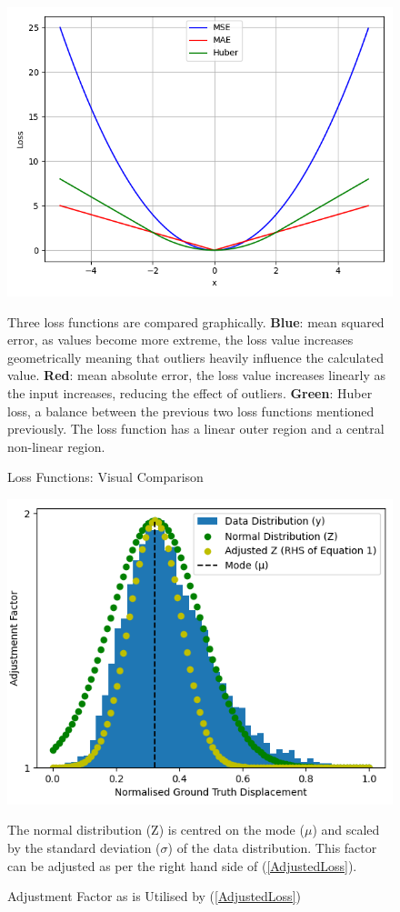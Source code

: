 \begin{figure}[h]
	\centering
	\includegraphics[scale=0.35]{Figures/lossPlots.png}
	\caption{Loss Functions: Visual Comparison} {Three loss functions are compared graphically. \textbf{Blue}: mean squared error, as values become more extreme, the loss value increases geometrically meaning that outliers heavily influence the calculated value. \textbf{Red}: mean absolute error, the loss value increases linearly as the input increases, reducing the effect of outliers. \textbf{Green}: Huber loss, a balance between the previous two loss functions mentioned previously. The loss function has a linear outer region and a central non-linear region.}
	\label{fig:lossPlots}
\end{figure}

\begin{figure}[h]
	\centering
	\includegraphics[scale=0.45]{Figures/norm_distr.png}
	\caption{Adjustment Factor as is Utilised by (\ref{AdjustedLoss})} {The normal distribution (Z) is centred on the mode ($\mu$) and scaled by the standard deviation ($\sigma$) of the data distribution. This factor can be adjusted as per the right hand side of (\ref{AdjustedLoss}).}
	\label{fig:adjustment}
\end{figure}

